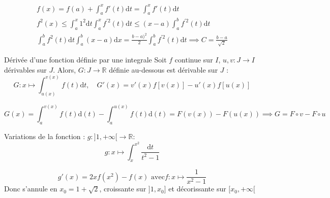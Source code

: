 \begin{myproof}{}{}
\begin{gather}
  f(x) = f(a) + \int_{a}^{x} f'(t) \mathrm{d} t = \int_{a}^{x} f'(t) \mathrm{d}t \\ 
  f ^{2}(x) \le \int_{a}^{x} 1 ^{2} \mathrm{d} t \int_{a}^{x} f^{'2}(t) \mathrm{d} t \le (x-a) \int_{a}^{b} f ^{'2}(t) \mathrm{d} t \\ 
  \int_{a}^{b} f ^{2}(t) \mathrm{d} t \int_{a}^{b}(x-a) \mathrm{d}x  = \frac{b-a) ^{2}}{2}  \int_{a}^{b} f ^{'2}(t) \mathrm{d} t \implies C = \frac{b-a}{\sqrt{2}} 
\end{gather} 
\end{myproof}

\begin{Theorem}{Dérivée d'une fonction définie par une integrale}{}
Soit $f$ continue sur $I$, $u, v : J \to I$ dérivables sur $J$. Alors, $G : J \to \mathbb{R}$ définie au-dessous est dérivable sur $J$ :
\begin{equation}
  G : x \mapsto \int_{u(x)}^{v(x)} f(t) \mathrm{d} t, \quad G'(x) = v'(x) f[v(x)] - u'(x) f[u(x)]
\end{equation}



\end{Theorem}

\begin{myproof}{}{}
\begin{equation}
  G(x) = \int_{a}^{v(x)} f(t) \mathrm{d}(t) - \int_{a}^{u(x)} f(t) \mathrm{d}(t) = F(v(x)) - F(u(x)) \implies G = F \circ v - F \circ u
\end{equation}
\end{myproof}

\begin{Example}{}{}
  Variations de la fonction : $g : ]1, + \infty[ \to \mathbb{R}$:
\begin{equation}
  g : x \mapsto \int_{x}^{x ^{2}} \frac{\mathrm{d}t}{t ^{2}-1} 
\end{equation}
\end{Example}

\begin{myproof}{}{}
\begin{equation}
  g'(x) = 2x f(x ^{2}) - f(x) \text{ avec} f : x \mapsto \frac{1}{x ^{2} - 1} 
\end{equation}
Donc s'annule en $x_0 = 1 + \sqrt{2}$, croissante sur $]1, x_0]$ et décorissante sur $[x_0, + \infty[$
\end{myproof}


